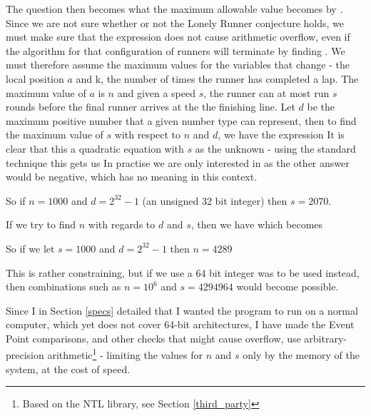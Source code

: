 The question then becomes what the maximum allowable value becomes by . Since we are not sure whether or not the Lonely Runner conjecture holds, we must make sure that the expression does not cause arithmetic overflow, even if the algorithm for that configuration of runners will terminate by finding \comFin. We must therefore assume the maximum values for the variables that change - the local position $a$ and k, the number of times the runner has completed a lap. The maximum value of $a$ is $n$ and given a speed $s$, the runner can at most run $s$ rounds before the final runner arrives at the the finishing line. Let $d$ be the maximum positive number that a given number type can represent, then to find the maximum value of $s$ with respect to $n$ and $d$, we have the expression 
It is clear that this a quadratic equation with $s$ as the unknown - using the standard technique this gets us
In practise we are only interested in
as the other answer would be negative, which has no meaning in this context.

So if $n = 1000$ and $d = 2^{32}-1$ (an unsigned 32 bit integer) then $s = 2070$.

If we try to find $n$ with regards to $d$ and $s$, then we have
which becomes

So if we let $s = 1000$ and $d = 2^{32}-1$ then $n = 4289$

This is rather constraining, but if we use a 64 bit integer was to be used instead, then combinations such as $n = 10^6$ and $s = 4294964$ would become possible.

Since I in Section \ref{specs} detailed that I wanted the program to run on a normal computer, which yet does not cover 64-bit architectures, I have made the Event Point comparisons, and other checks that might cause overflow, use arbitrary-precision arithmetic\footnote{Based on the NTL library, see Section \ref{third_party}} - limiting the values for $n$ and $s$ only by the memory of the system, at the cost of speed.

